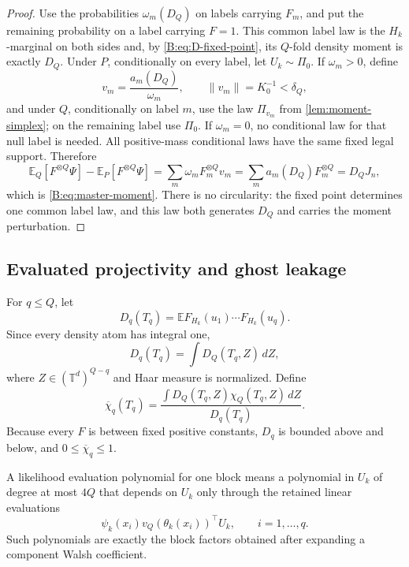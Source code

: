 \documentclass[11pt]{article}
\newcommand{\E}{\mathbb{E}}
\newcommand{\Torus}{\mathbb{T}}
\newcommand{\norm}[1]{\lVert #1\rVert}
\begin{document}
\begin{proof}
Use the probabilities \(\omega_m(D_Q)\) on labels carrying \(F_m\), and put
the remaining probability on a label carrying \(F=1\).  This common label
law is the \(H_k\)-marginal on both sides and, by
\eqref{B:eq:D-fixed-point}, its \(Q\)-fold density moment is exactly \(D_Q\).
Under \(P\), conditionally on every label, let \(U_k\sim\Pi_0\).  If
\(\omega_m>0\), define
\[
 v_m=\frac{a_m(D_Q)}{\omega_m},
 \qquad \norm{v_m}=K_0^{-1}<\delta_Q,
\]
and under \(Q\), conditionally on label \(m\), use the law \(\Pi_{v_m}\)
from \cref{lem:moment-simplex}; on the remaining label use \(\Pi_0\).  If
\(\omega_m=0\), no conditional law for that null label is needed.  All
positive-mass conditional laws have the same fixed legal support.  Therefore
\[
 \E_Q[F^{\otimes Q}\Psi]-\E_P[F^{\otimes Q}\Psi]
 =\sum_m\omega_mF_m^{\otimes Q}v_m
 =\sum_ma_m(D_Q)F_m^{\otimes Q}
 =D_QJ_n,
\]
which is \eqref{B:eq:master-moment}.  There is no circularity: the fixed
point determines one common label law, and this law both generates
\(D_Q\) and carries the moment perturbation.
\end{proof}

\subsection{Evaluated projectivity and ghost leakage}

For \(q\le Q\), let
\[
 D_q(T_q)=\E F_{H_k}(u_1)\cdots F_{H_k}(u_q).
\]
Since every density atom has integral one,
\begin{equation}
 D_q(T_q)=\int D_Q(T_q,Z)\,dZ,
 \label{B:eq:D-projectivity}
\end{equation}
where \(Z\in(\Torus^d)^{Q-q}\) and Haar measure is normalized.
Define
\begin{equation}
 \overline\chi_q(T_q)
 =\frac{\int D_Q(T_q,Z)\chi_Q(T_q,Z)\,dZ}{D_q(T_q)}.
 \label{B:eq:chi-bar}
\end{equation}
Because every \(F\) is between fixed positive constants,
\(D_q\) is bounded above and below, and \(0\le\overline\chi_q\le1\).

A likelihood evaluation polynomial for one block means a polynomial in
\(U_k\) of degree at most \(4Q\) that depends on \(U_k\) only through the
retained linear evaluations
\[
 \psi_k(x_i)v_Q(\theta_k(x_i))^\top U_k,
 \qquad i=1,\ldots,q.
\]
Such polynomials are exactly the block factors obtained after expanding a
component Walsh coefficient.
\end{document}
